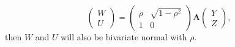 \documentclass{huhtakm-template-book-v2}
\begin{document}
\begin{eg}
        \begin{equation*}
            \begin{pmatrix}
                W\\
                U
            \end{pmatrix} = \begin{pmatrix}
                \rho & \sqrt{1-\rho^{2}}\\
                1 & 0
            \end{pmatrix}\mathbf{A}\begin{pmatrix}
                Y\\
                Z
            \end{pmatrix},
        \end{equation*}
        then $W$ and $U$ will also be bivariate normal with $\rho$.
    \end{eg}
    \newpage
\end{document}
